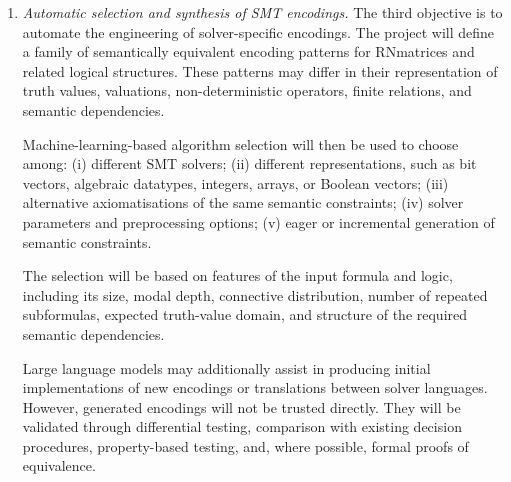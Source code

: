 \documentclass[a4paper]{article}
\begin{document}
\begin{enumerate}
A model may predict promising truth values for atomic formulas and selected subformulas, prioritizing assignments that are likely to make the target formula non-designated. It may also rank candidate supporting valuations or predict which semantic dependencies are likely to cause a partial valuation to be rejected. Information extracted from unsuccessful attempts can be used to learn recurring conflict patterns, analogously to the way symbolic solvers record combinations of decisions that cannot lead to a solution.

The AI component may be used either in the explicit truth-table procedure or as a source of branching hints for an SMT encoding. In both cases, the predictions will remain heuristic: a proposed valuation must satisfy the complete RNmatrix constraints before it can be reported as a counterexample.

An additional goal will be the construction of small and intelligible countermodels. The learned component may guide the search toward valuations involving fewer rows, fewer supporting relations, or simpler assignments. This could improve both performance and the explanatory quality of the generated results.

\item {\em Automatic selection and synthesis of SMT encodings.}
The third objective is to automate the engineering of solver-specific encodings.
%
The project will define a family of semantically equivalent encoding patterns for RNmatrices and related logical structures. These patterns may differ in their representation of truth values, valuations, non-deterministic operators, finite relations, and semantic dependencies.

Machine-learning-based algorithm selection will then be used to choose among: (i) different SMT solvers; (ii) different representations, such as bit vectors, algebraic datatypes, integers, arrays, or Boolean vectors; (iii) alternative axiomatisations of the same semantic constraints; (iv) solver parameters and preprocessing options; (v) eager or incremental generation of semantic constraints.

The selection will be based on features of the input formula and logic, including its size, modal depth, connective distribution, number of repeated subformulas, expected truth-value domain, and structure of the required semantic dependencies.

Large language models may additionally assist in producing initial implementations of new encodings or translations between solver languages. However, generated encodings will not be trusted directly. They will be validated through differential testing, comparison with existing decision procedures, property-based testing, and, where possible, formal proofs of equivalence.


\end{enumerate}
\end{document}

